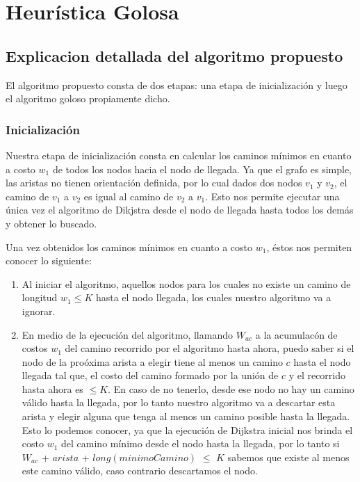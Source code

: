\section{Heur\'istica Golosa}
\subsection{Explicacion detallada del algoritmo propuesto}

El algoritmo propuesto consta de dos etapas: una etapa de inicializaci\'on y luego el algoritmo goloso propiamente dicho.

\subsubsection{Inicializaci\'on}

Nuestra etapa de inicializaci\'on consta en calcular los caminos m\'inimos en cuanto a costo $w_1$ de todos los nodos hacia el nodo de llegada. Ya que el grafo es simple, las aristas no tienen orientaci\'on definida, por lo cual dados dos nodos $v_1$ y $v_2$, el camino de $v_1$ a $v_2$ es igual al camino de $v_2$ a $v_1$. Esto nos permite ejecutar una \'unica vez el algoritmo de Dikjstra desde el nodo de llegada hasta todos los dem\'as y obtener lo buscado.

\vspace{2mm}

Una vez obtenidos los caminos m\'inimos en cuanto a costo $w_1$, \'estos nos permiten conocer lo siguiente:

\begin{enumerate}
\item Al iniciar el algoritmo, aquellos nodos para los cuales no existe un camino de longitud $w_1 \leq K$ hasta el nodo llegada, los cuales nuestro algoritmo va a ignorar.
\item En medio de la ejecuci\'on del algoritmo, llamando $W_{ac}$ a la acumulac\'on de costos $w_1$ del camino recorrido por el algoritmo hasta ahora, puedo saber si el nodo de la pro\'oxima arista a elegir tiene al menos un camino $c$ hasta el nodo llegada tal que, el costo del camino formado por la uni\'on de $c$ y el recorrido hasta ahora es $\leq K$. En caso de no tenerlo, desde ese nodo no hay un camino v\'alido hasta la llegada, por lo tanto nuestro algoritmo va a descartar esta arista y elegir alguna que tenga al menos un camino posible hasta la llegada. Esto lo podemos conocer, ya que la ejecuci\'on de Dijkstra inicial nos brinda el costo $w_1$ del camino m\'inimo desde el nodo hasta la llegada, por lo tanto  si $W_{ac}$ + $arista$ + $long(minimoCamino)$ $\leq$ $K$ sabemos que existe al menos este camino v\'alido, caso contrario descartamos el nodo.
\end{enumerate}


